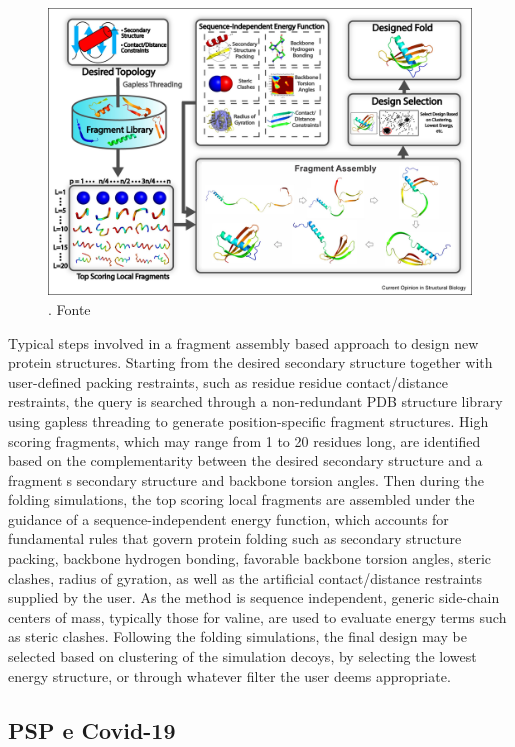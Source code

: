 \begin{figure}[!htb]
	\centering
	\includegraphics[scale=0.95]{images/fragment-assembly.jpg}
	\caption{. Fonte\cite{pearce2021deep}}
	\label{fig:fragment-assembly}
\end{figure}

Typical steps involved in a fragment assembly based approach to design new protein structures. Starting from the desired secondary structure together with user-defined packing restraints, such as residue⿿residue contact/distance restraints, the query is searched through a non-redundant PDB structure library using gapless threading to generate position-specific fragment structures. High scoring fragments, which may range from 1 to 20 residues long, are identified based on the complementarity between the desired secondary structure and a fragment⿿s secondary structure and backbone torsion angles. Then during the folding simulations, the top scoring local fragments are assembled under the guidance of a sequence-independent energy function, which accounts for fundamental rules that govern protein folding such as secondary structure packing, backbone hydrogen bonding, favorable backbone torsion angles, steric clashes, radius of gyration, as well as the artificial contact/distance restraints supplied by the user. As the method is sequence independent, generic side-chain centers of mass, typically those for valine, are used to evaluate energy terms such as steric clashes. Following the folding simulations, the final design may be selected based on clustering of the simulation decoys, by selecting the lowest energy structure, or through whatever filter the user deems appropriate.

\subsection{PSP e Covid-19}
